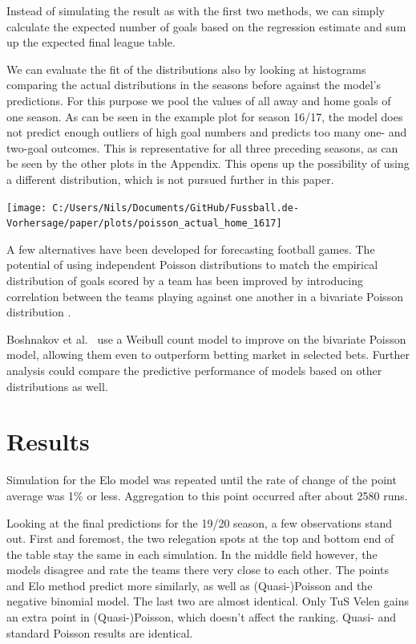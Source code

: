 \documentclass[12pt,a4paper]{article}
\begin{document}
Instead of simulating the result as with the first two methods, we can
simply calculate the expected number of goals based on the regression
estimate and sum up the expected final league table.

We can evaluate the fit of the distributions also by looking at
histograms comparing the actual distributions in the seasons before
against the model's predictions. For this purpose we pool the values of
all away and home goals of one season. As can be seen in the example
plot for season 16/17, the model does not predict enough outliers of
high goal numbers and predicts too many one- and two-goal outcomes. This
is representative for all three preceding seasons, as can be seen by the
other plots in the Appendix. This opens up the possibility of using a
different distribution, which is not pursued further in this paper.

\texttt{[image: C:/Users/Nils/Documents/GitHub/Fussball.de-Vorhersage/paper/plots/poisson\_actual\_home\_1617]}

A few alternatives have been developed for forecasting football games.
The potential of using independent Poisson distributions to match the
empirical distribution of goals scored by a team has been improved by
introducing correlation between the teams playing against one another in
a bivariate Poisson distribution \textcite{karlis2003}.

Boshnakov et al.~\autocite*{boshnakov2016} use a Weibull count model to
improve on the bivariate Poisson model, allowing them even to outperform
betting market in selected bets. Further analysis could compare the
predictive performance of models based on other distributions as well.

\hypertarget{results}{%
\section{Results}\label{results}}

Simulation for the Elo model was repeated until the rate of change of
the point average was 1\% or less. Aggregation to this point occurred
after about 2580 runs.

Looking at the final predictions for the 19/20 season, a few
observations stand out. First and foremost, the two relegation spots at
the top and bottom end of the table stay the same in each simulation. In
the middle field however, the models disagree and rate the teams there
very close to each other. The points and Elo method predict more
similarly, as well as (Quasi-)Poisson and the negative binomial model.
The last two are almost identical. Only TuS Velen gains an extra point
in (Quasi-)Poisson, which doesn't affect the ranking. Quasi- and
standard Poisson results are identical.
\end{document}
